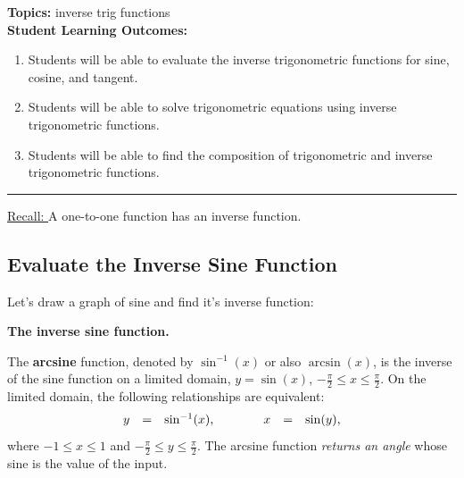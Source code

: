 


\noindent \textbf{Topics:}  inverse trig functions\\

\noindent \textbf{Student Learning Outcomes:}
\begin{enumerate}
\item Students will be able to evaluate the inverse trigonometric functions for sine, cosine, and tangent.
\item Students will be able to solve trigonometric equations using inverse trigonometric functions.
\item Students will be able to find the composition of trigonometric and inverse trigonometric functions.
\end{enumerate}

\hrule 

\bigskip

\noindent \underline{Recall:  } A one-to-one function has an inverse function.
\subsection{Evaluate the Inverse Sine Function}

Let's draw a graph of sine and find it's inverse function:
\vfill

   \noindent\colorbox{blue!10}{%
   \parbox{\dimexpr\linewidth}%
   {%
     \textbf{The inverse sine function.}

     The \textbf{arcsine} function, denoted by $\sin^{-1}(x)$ or also
     $\arcsin(x)$, is the inverse of the sine function on a limited
     domain, $y=\sin(x)$, $-\frac{\pi}{2} \leq x \leq
     \frac{\pi}{2}$. On the limited domain, the following
     relationships are equivalent:
     \begin{eqnarray*}
       \begin{array}{rcl@{\hspace{4em}}rcl}
         y & = & \sin^{-1}(x), & x & = & \sin(y),
       \end{array}
     \end{eqnarray*}
     where $-1 \leq x \leq 1$ and
     $-\frac{\pi}{2} \leq y \leq \frac{\pi}{2}$. The arcsine function
     \textit{returns an angle} whose sine is the value of the input.

     }
 }

